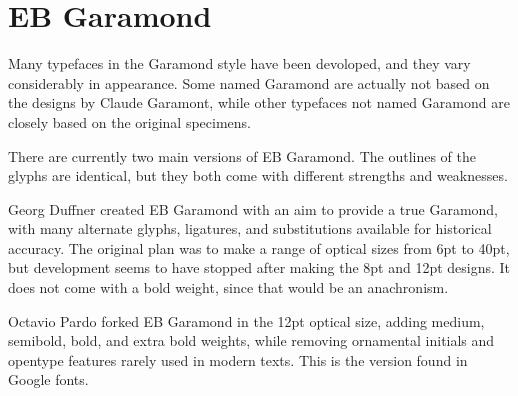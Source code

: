 \switchtobodyfont[duffnerebgaramond,10pt]
\chapter[ebgaramond]{EB Garamond}

Many typefaces in the Garamond style have been devoloped, and they vary considerably in appearance. Some named Garamond are actually not based on the designs by Claude Garamont, while other typefaces not named Garamond are closely based on the original specimens.

There are currently two main versions of EB Garamond. The outlines of the glyphs are identical, but they both come with different strengths and weaknesses.

Georg Duffner created EB Garamond with an aim to provide a true Garamond, with many alternate glyphs, ligatures, and substitutions available for historical accuracy. The original plan was to make a range of optical sizes from 6pt to 40pt, but development seems to have stopped after making the 8pt and 12pt designs. It does not come with a bold weight, since that would be an anachronism. 

Octavio Pardo forked EB Garamond in the 12pt optical size, adding medium, semibold, bold, and extra bold weights, while removing ornamental initials and opentype features rarely used in modern texts. This is the version found in Google fonts.


